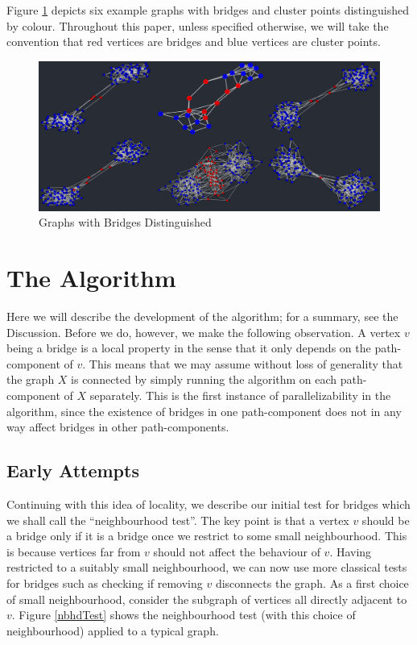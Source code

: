 \documentclass[12pt,a4paper]{amsart}
\numberwithin{equation}{section}
\theoremstyle{plain}
\theoremstyle{definition}
\begin{document}
Figure \ref{bridges} depicts six example graphs with bridges and cluster points distinguished by colour. Throughout this paper, unless specified otherwise, we will take the convention that red vertices are bridges and blue vertices are cluster points.

\begin{figure}[h]
	\centering
	\includegraphics[scale=0.5]{BridgesDistinguished.jpg}
	\caption{Graphs with Bridges Distinguished}
	\label{bridges}
\end{figure}

\newpage

\section{The Algorithm}

Here we will describe the development of the algorithm; for a summary, see the Discussion. Before we do, however, we make the following observation. A vertex $v$ being a bridge is a local property in the sense that it only depends on the path-component of $v$. This means that we may assume without loss of generality that the graph $X$ is connected by simply running the algorithm on each path-component of $X$ separately. This is the first instance of parallelizability in the algorithm, since the existence of bridges in one path-component does not in any way affect bridges in other path-components.

\subsection{Early Attempts}

Continuing with this idea of locality, we describe our initial test for bridges which we shall call the ``neighbourhood test''. The key point is that a vertex $v$ should be a bridge only if it is a bridge once we restrict to some small neighbourhood. This is because vertices far from $v$ should not affect the behaviour of $v$. Having restricted to a suitably small neighbourhood, we can now use more classical tests for bridges such as checking if removing $v$ disconnects the graph. As a first choice of small neighbourhood, consider the subgraph of vertices all directly adjacent to $v$. Figure \ref{nbhdTest} shows the neighbourhood test (with this choice of neighbourhood) applied to a typical graph.
\end{document}
